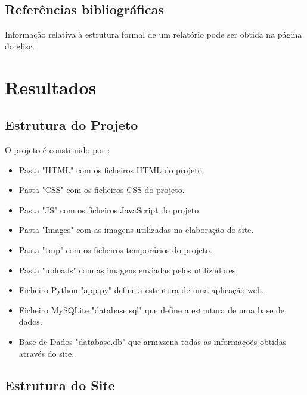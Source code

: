 \documentclass{report}
\begin{document}
\newpage

%

\section{Referências bibliográficas}\label{sec:referencias-bibliograficas}
Informação relativa à estrutura formal de um relatório pode ser obtida
na página do \ac{glisc}\cite{glisc}.

\chapter{Resultados}
\label{chap.resultados}

\section {Estrutura do Projeto}\label{sec:estrutura-do-projeto}

O projeto é constituido por :

\begin{itemize}
    \item Pasta "HTML" com os ficheiros HTML do projeto.
    \item Pasta "CSS" com os ficheiros CSS do projeto.
    \item Pasta "JS" com os ficheiros JavaScript do projeto.
    \item Pasta "Images" com as imagens utilizadas na elaboração do site.
    \item Pasta "tmp" com os ficheiros temporários do projeto.
    \item Pasta "uploads" com as imagens enviadas pelos utilizadores.
    \item Ficheiro Python "app.py" define a estrutura de uma aplicação web.
    \item Ficheiro MySQLite "database.sql" que define a estrutura de uma base de dados.
    \item Base de Dados "database.db" que armazena todas as informaçoẽs obtidas através do site.
\end{itemize}

\section {Estrutura do Site}\label{sec:estrutura-do-site}
\end{document}
